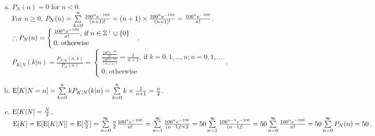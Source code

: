 \begin{pr}$ $
\begin{enumerate}[(a)]
\item $P_N(n)=0$ for $n<0$.\\
For $n\geq0$, $P_N(n)=\sum\limits_{k=0}^n\frac{100^ne^{-100}}{(n+1)!}=(n+1)\times\frac{100^ne^{-100}}{(n+1)!}=\frac{100^ne^{-100}}{n!}$.\\
$\therefore P_N(n)=\begin{cases}
\frac{100^ne^{-100}}{n!}\text{, if }n\in\mathbb{Z}^+\cup\{0\}\\
0\text{, otherwise}
\end{cases}$.\\
$P_{K|N}(k|n)=\frac{P_{N, K}(n, k)}{P_N(n)}=\begin{cases}
\frac{\frac{100^ne^{-100}}{n!}}{\frac{100^ne^{-100}}{(n+1)!}}=\frac1{n+1}\text{, if }k=0, 1, \dots, n; n=0, 1, \dots\\
0\text{, otherwise}
\end{cases}$.
\item $\mathrm{E}[K|N=n]=\sum\limits_{k=0}^nkP_{K|N}(k|n)=\sum\limits_{k=0}^nk\times\frac1{n+1}=\frac n2$.
\item	$\mathrm{E}[K|N]=\frac N2$.\\
$\mathrm{E}[K]=\mathrm{E}[\mathrm{E}[K|N]]=\mathrm{E}[\frac N2]=\sum\limits_{n=0}^\infty\frac n2\frac{100^ne^{-100}}{n!}=\sum\limits_{n=1}^\infty\frac{100^ne^{-100}}{(n-1)!\times2}=50\sum\limits_{n=1}^\infty\frac{100^{n-1}e^{-100}}{(n-1)!}=50\sum\limits_{n=0}^\infty\frac{100^ne^{-100}}{n!}=50\sum\limits_{n=0}^\infty P_N(n)=50$.
\end{enumerate}
\end{pr}
